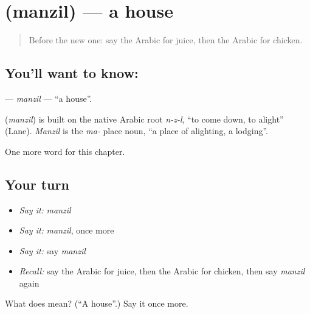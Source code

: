 \section[\texorpdfstring{\ar{منزل} (manzil)}{منزل (manzil)}]{ (manzil) — a house}

\label{lesson:AR-C69-manzil}



\begin{quote}
Before the new one: say the Arabic for juice, then the Arabic for chicken.
\end{quote}

\subsection*{You'll want to know: }
\textbf{} — \emph{manzil} — \textquotedblleft{}a house\textquotedblright{}.

\begin{cousinweb}
\textbf{} (\emph{manzil}) is built on the native Arabic root \emph{n-z-l}, \textquotedblleft{}to come down, to alight\textquotedblright{} (Lane). \emph{Manzil} is the \emph{ma-} place noun, \textquotedblleft{}a place of alighting, a lodging\textquotedblright{}.
\end{cousinweb}

\begin{grammarlens}[title={What you've built}]
One more word for this chapter.
\end{grammarlens}

\subsection*{Your turn}
\begin{itemize}
\raggedright
  \item \emph{Say it:} \emph{manzil}
  \item \emph{Say it:} \emph{manzil}, once more
  \item \emph{Say it:} say \emph{manzil}
  \item \emph{Recall:} say the Arabic for juice, then the Arabic for chicken, then say \emph{manzil} again
\end{itemize}

\begin{tcolorbox}[breakable,colback=teal!4,colframe=teal!35!black,title={Before you move on}]
What does  mean? (\textquotedblleft{}A house\textquotedblright{}.) Say it once more.
\end{tcolorbox}
